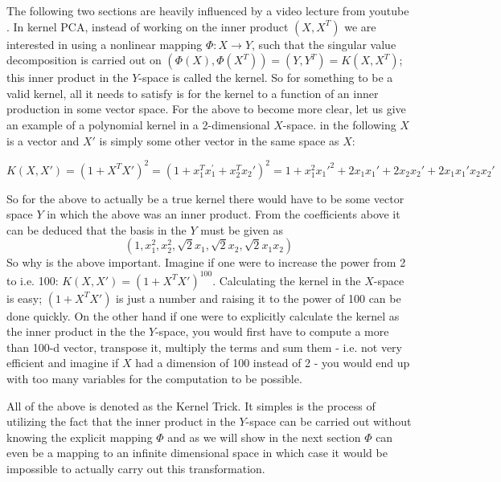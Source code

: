 The following two sections are heavily influenced by a video lecture from youtube \cite[from minutes 10-30]{youtube-caltech}. In kernel PCA, instead of working on the inner product $(X,X^T)$ we are interested in using a nonlinear mapping $\Phi: X\rightarrow Y$, such that the singular value decomposition is carried out on $(\Phi(X),\Phi(X^T))=(Y,Y^T)=K(X,X^T)$; this inner product in the $Y$-space is called the kernel. 
So for something to be a valid kernel, all it needs to satisfy is for the kernel to a function of an inner production in some vector space.
For the above to become more clear, let us give an example of a polynomial kernel in a 2-dimensional $X$-space. in the following $X$ is a vector and $X'$ is simply some other vector in the same space as $X$:

\begin{equation}
K(X,X')=(1+X^T X')^2=(1+x_1^T x_1^{'}+x_2^T x_2 ')^2=1+x_1^2 {x_1 '}^2 +2 x_1 x_1 '+2 x_2 x_2 '+2 x_1 x_1 ' x_2 x_2'
\end{equation}

So for the above to actually be a true kernel there would have to be some vector space $Y$ in which the above was an inner product. From the coefficients above it can be deduced that the basis in the $Y$ must be given as
\begin{equation}
(1,x_1^2,x_2^2,\sqrt{2} x_1, \sqrt{2} x_2 , \sqrt{2} x_1 x_2)
\end{equation}
So why is the above important. Imagine if one were to increase the power from 2 to i.e. 100: $K(X,X')=(1+X^T X')^100$. Calculating the kernel in the $X$-space is easy; $(1+X^T X')$ is just a number and raising it to the power of 100 can be done quickly. 
On the other hand if one were to explicitly calculate the kernel as the inner product in the the $Y$-space, you would first have to compute a more than 100-d vector, transpose it, multiply the terms and sum them - i.e. not very efficient and imagine if $X$ had a dimension of 100 instead of 2 - you would end up with too many variables for the computation to be possible.

 All of the above is denoted as the Kernel Trick. It simples is the process of utilizing the fact that the inner product in the $Y$-space can be carried out without knowing the explicit mapping $\Phi$ and as we will show in the next section $\Phi$ can even be a mapping to an infinite dimensional space in which case it would be impossible to actually carry out this transformation.

